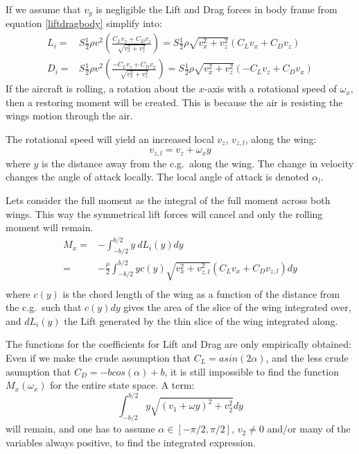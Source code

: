 If we assume that $v_y$ is negligible the Lift and Drag forces in body frame from equation \ref{liftdragbody} simplify into:
\begin{equation}\begin{split}
    L_i =& 
     S \frac{1}{2} \rho v^2 \left( \frac{C_L v_x + C_D v_z}{\sqrt{v_x^2 + v_z^2}} \right) = 
      S \frac{1}{2} \rho \sqrt{v_x^2 + v_z^2} \left(C_L v_x + C_D v_z \right)\\
    D_i =& 
     S \frac{1}{2} \rho v^2 \left( \frac{-C_L v_z + C_D v_x}{ \sqrt{v_x^2 + v_z^2}} \right)
     = S \frac{1}{2} \rho \sqrt{v_x^2 + v_z^2} \left(-C_L v_z + C_D v_x\right)
     \label{liftdragbody2}
\end{split}\end{equation}
If the aircraft is rolling, a rotation about the $x$-axis with a rotational speed of $\omega_x$, then a restoring moment will be created.
This is because the air is resisting the wings motion through the air.

The rotational speed will yield an increased local $v_z$, $v_{z,l}$, along the wing:
\begin{equation}
    v_{z, l} = v_z + \omega_x y
\end{equation}
where $y$ is the distance away from the c.g.~along the wing.
The change in velocity changes the angle of attack locally.
The local angle of attack is denoted $\alpha_l$.

Lets consider the full moment as the integral of the full moment across both wings.
This way the symmetrical lift forces will cancel and only the rolling moment will remain.
\begin{equation}\begin{split}
    M_x =& -\int_{-b/2}^{b/2} y ~ dL_i(y) dy \\
    =& -\frac{\rho}{2}\int_{-b/2}^{b/2} y c(y) \sqrt{v_x^2 + v_{z,l}^2} \left(C_L v_x + C_D v_{z,l} \right) dy \\
\end{split}\end{equation}
where $c(y)$ is the chord length of the wing as a function of the distance from the c.g.~such that $c(y) dy$ gives the area of the slice of the wing integrated over, and $dL_i(y)$ the Lift generated by the thin slice of the wing integrated along.

The functions for the coefficients for Lift and Drag are only empirically obtained: 
Even if we make the crude assumption that $C_L = a sin(2\alpha)$, and the less crude asumption that $C_D = -b cos(\alpha) + b$, it is still impossible to find the function $M_x(\omega_x)$ for the entire state space.
A term:
\begin{equation}
    \int_{-b/2}^{b/2} y \sqrt{(v_1 + \omega y)^2 + v_2^2} dy
\end{equation}
will remain, and one has to assume $\alpha \in [-\pi/2, \pi/2]$, $v_2 \neq 0$ and/or many of the variables always positive, to find the integrated expression.

